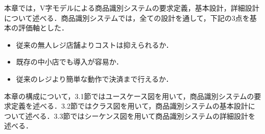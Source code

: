 

本章では，V字モデルによる商品識別システムの要求定義，基本設計，詳細設計について述べる．商品識別システムでは，全ての設計を通して，下記の3点を基本の評価軸とした．

\begin{itemize}
\item 従来の無人レジ店舗よりコストは抑えられるか．
\item 既存の中小店でも導入が容易か．
\item 従来のレジより簡単な動作で決済まで行えるか．
\end{itemize}


本章の構成について，3.1節ではユースケース図を用いて，商品識別システムの要求定義を述べる．3.2節ではクラス図を用いて，商品識別システムの基本設計について述べる．3.3節ではシーケンス図を用いて商品識別システムの詳細設計を述べる．
